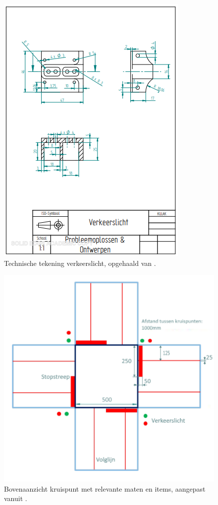 \documentclass[12pt]{article}
\begin{document}
\begin{figure}
	\centering
	\includegraphics[width=.8\textwidth]{verkeerslicht}
	\caption{Technische tekening verkeerslicht, opgehaald van \cite{artikel1}. }
	\label{fig: verkeerslicht}
\end{figure}
\bigskip
\begin{figure}
	\centering
	\includegraphics[width=.8\textwidth]{bovenaanzichtkruispunt}
	\caption{Bovenaanzicht kruispunt met relevante maten en items, aangepast vanuit \cite{Smart}.
	}
	\label{fig: kruispunt}
\end{figure}








\end{document}
